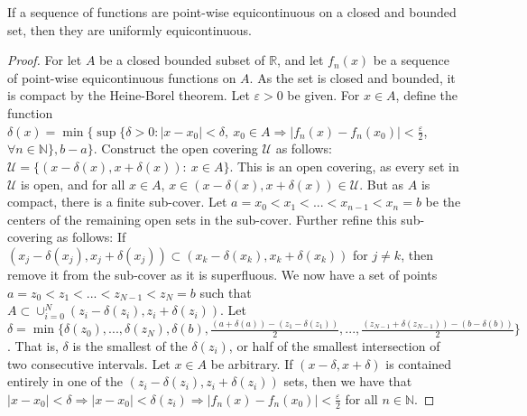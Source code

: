 \documentclass[crop=false,class=book,oneside]{standalone}
\begin{document}
            \begin{theorem}
                If a sequence of functions are
                point-wise equicontinuous on a closed
                and bounded set, then they are
                uniformly equicontinuous.
            \end{theorem}
            \begin{proof}
                For let $A$ be a closed bounded subset
                of $\mathbb{R}$, and let $f_n(x)$ be a sequence
                of point-wise equicontinuous functions on $A$.
                As the set is closed and bounded, it is compact
                by the Heine-Borel theorem. Let $\varepsilon>0$
                be given. For $x\in A$, define the function
                $\delta(x)%
                 =\min\{\sup\{\delta>0:|x-x_0|<\delta,\ x_0\in A%
                  \Rightarrow |f_n(x)-f_n(x_0)|<\frac{\varepsilon}{2}$,
                $\forall n\in\mathbb{N}\},b-a\}$.
                Construct the open covering $\mathcal{U}$ as
                follows:
                $\mathcal{U}=\{(x-\delta(x),x+\delta(x)):\ x\in A\}$.
                This is an open covering, as every set in
                $\mathcal{U}$ is open, and for all
                $x\in A$, $x\in(x-\delta(x),x+\delta(x))\in\mathcal{U}$.
                But as $A$ is compact, there is a finite sub-cover.
                Let $a=x_0<x_1<...<x_{n-1}<x_n=b$ be the centers
                of the remaining open sets in the sub-cover.
                Further refine this sub-covering as follows: If
                $(x_j-\delta(x_j),x_j+\delta(x_j))%
                 \subset (x_k-\delta(x_k),x_k+\delta(x_k))$
                for $j\ne k$, then remove it from the sub-cover as
                it is superfluous. We now have a set of points
                $a=z_0<z_1<...<z_{N-1}<z_N=b$ such that
                $A\subset\cup_{i=0}^{N} (z_i-\delta(z_i),z_i+\delta(z_i))$.
                Let
                $\delta%
                 =\min\{\delta(z_0),...,\delta(z_N),\delta(b),%
                        \frac{(a+\delta(a))-(z_1-\delta(z_1))}{2},%
                        ...,%
                        \frac{(z_{N-1}+\delta(z_{N-1}))-(b-\delta(b))}{2}\}$.
                That is, $\delta$ is the smallest of the $\delta(z_i)$,
                or half of the smallest intersection of two consecutive
                intervals. Let $x\in A$ be arbitrary. If $(x-\delta,x+\delta)$
                is contained entirely in one of the
                $(z_i-\delta(z_i),z_i+\delta(z_i))$ sets, then we have
                that $|x-x_0|<\delta \Rightarrow |x-x_0| <\delta(z_i) \Rightarrow |f_n(x)-f_n(x_0)|<\frac{\varepsilon}{2}$ for all $n\in\mathbb{N}$.

\end{proof}
\end{document}
